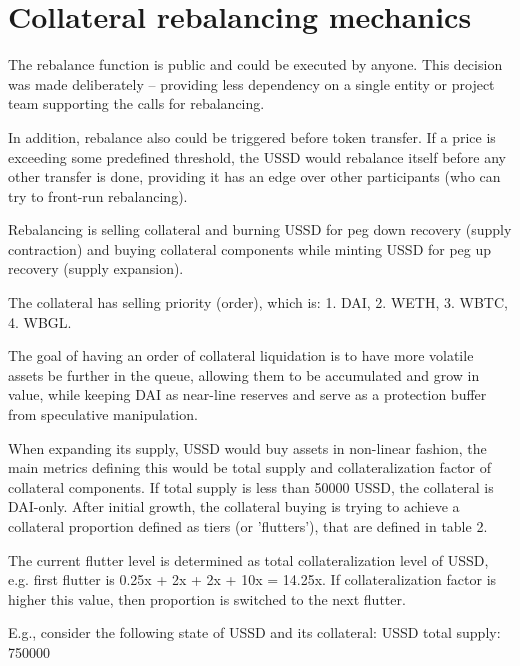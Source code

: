 \section{Collateral rebalancing mechanics}

The rebalance function is public and could be executed by anyone. This decision was 
made deliberately – providing less dependency on a single entity or project team 
supporting the calls for rebalancing.

In addition, rebalance also could be triggered before token transfer. If a price is 
exceeding some predefined threshold, the USSD would rebalance itself before any other 
transfer is done, providing it has an edge over other participants (who can try to 
front-run rebalancing).

Rebalancing is selling collateral and burning USSD for peg down recovery (supply 
contraction) and buying collateral components while minting USSD for peg up recovery 
(supply expansion).

The collateral has selling priority (order), which is:
1. DAI, 2. WETH, 3. WBTC, 4. WBGL. 

The goal of having an order of collateral liquidation is to have more volatile assets 
be further in the queue, allowing them to be accumulated and grow in value, while keeping 
DAI as near-line reserves and serve as a protection buffer from speculative manipulation.

When expanding its supply, USSD would buy assets in non-linear fashion, the main metrics 
defining this would be total supply and collateralization factor of collateral components. 
If total supply is less than 50000 USSD, the collateral is DAI-only. After initial growth, 
the collateral buying is trying to achieve a collateral proportion defined as tiers (or 
'flutters'), that are defined in table 2.

The current flutter level is determined as total collateralization level of USSD, e.g. 
first flutter is 0.25x + 2x + 2x + 10x = 14.25x. If collateralization factor is higher 
this value, then proportion is switched to the next flutter.

E.g., consider the following state of USSD and its collateral:
USSD total supply: 750000

